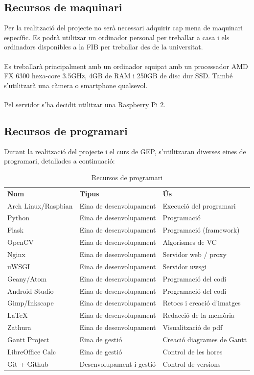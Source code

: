 	\subsection{Recursos de maquinari}
		Per la realització del projecte no serà necessari adquirir cap mena de maquinari específic. Es podrà utilitzar un ordinador personal per treballar a casa i els ordinadors disponibles a la FIB per
		treballar des de la universitat.\\\\
		Es treballarà principalment amb un ordinador equipat amb un processador AMD FX 6300 hexa-core 3.5GHz, 4GB de RAM i 250GB de disc dur SSD. També s'utilitzarà una càmera o smartphone qualsevol.\\\\
		Pel servidor s'ha decidit utilitzar una Raspberry Pi 2.
	\subsection{Recursos de programari}
	Durant la realització del projecte i el curs de GEP, s'utilitzaran diverses eines de programari, detallades a continuació:\\
	\begin{table}[H]
		\begin{center}
			\begin{tabular}{l !{\vrule width -1pt}p{5cm} !{\vrule width -1pt}p{5cm}}
				\textbf{Nom} & \textbf{Tipus} & \textbf{Ús} \\ %
				Arch Linux/Raspbian & Eina de desenvolupament & Execució del programari \\
				Python & Eina de desenvolupament & Programació \\
				Flask & Eina de desenvolupament & Programació (framework) \\
				OpenCV & Eina de desenvolupament & Algorismes de VC \\
				Nginx & Eina de desenvolupament & Servidor web / proxy \\
				uWSGI & Eina de desenvolupament & Servidor uwsgi \\
				Geany/Atom & Eina de desenvolupament & Programació del codi \\
				Android Studio & Eina de desenvolupament & Programació del codi \\
				Gimp/Inkscape & Eina de desenvolupament & Retocs i creació d'imatges \\
				\LaTeX & Eina de desenvolupament & Redacció de la memòria \\
				Zathura & Eina de desenvolupament & Visualització de pdf \\
				Gantt Project & Eina de gestió & Creació diagrames de Gantt \\
				LibreOffice Calc & Eina de gestió & Control de les hores \\
				Git + Github & Desenvolupament i gestió & Control de versions \\
			\end{tabular}
		\end{center}
		\caption{Recursos de programari}
		\label{table:programari}
	\end{table}
	
